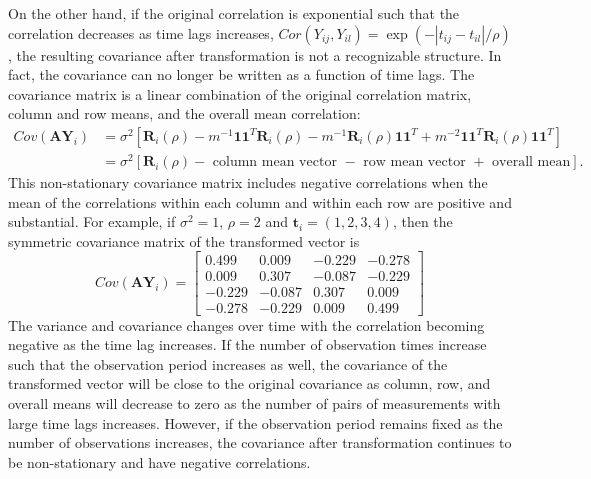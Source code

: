 \documentclass[12pt]{article}
\newcommand{\B}[0]{\mathbf}
\begin{document}
 On the other hand, if the original correlation is exponential such that the correlation decreases as time lags increases, $Cor(Y_{ij},Y_{il}) = \exp(-|t_{ij}-t_{il}|/\rho)$, the resulting covariance after transformation is not a recognizable structure. In fact, the covariance can no longer be written as a function of time lags. The covariance matrix is a linear combination of the original correlation matrix, column and row means, and the overall mean correlation:
   \begin{align*}
 Cov(\B A\B Y_{i}) &= \sigma^{2}\left[\B R_{i}(\rho)-m^{-1}\B1\B1^{T}\B R_{i}(\rho)-m^{-1}\B R_{i}(\rho)\B1\B1^{T} + m^{-2}\B1\B1^{T}\B R_{i}(\rho)\B1\B1^{T}\right]\\
  &= \sigma^{2}\left[\B R_{i}(\rho)-\text{ column mean vector }-\text{ row mean vector } + \text{ overall mean}\right].
 \end{align*} 
 This non-stationary covariance matrix includes negative correlations when the mean of the correlations within each column and within each row are positive and substantial. For example, if $\sigma^{2}=1$, $\rho = 2$ and $\B t_{i}=(1,2,3,4)$, then the symmetric covariance matrix of the transformed vector is
$$ Cov(\B A\B Y_{i}) = \left[ \begin{array}{cccc}
 0.499&  0.009& -0.229& -0.278\\
  0.009&  0.307& -0.087& -0.229\\
 -0.229& -0.087&  0.307&  0.009\\
 -0.278& -0.229&  0.009&  0.499
\end{array}\right]$$
The variance and covariance changes over time with the correlation becoming negative as the time lag increases.  If the number of observation times increase such that the observation period increases as well, the covariance of the transformed vector will be close to the original covariance as column, row, and overall means will decrease to zero as the number of pairs of measurements with large time lags increases. However, if the observation period remains fixed as the number of observations increases, the covariance after transformation continues to be non-stationary and have negative correlations.  
\end{document}
